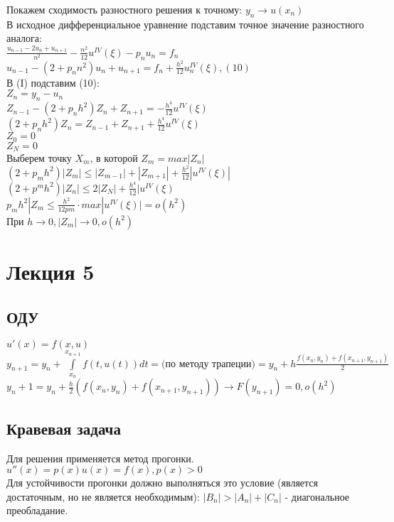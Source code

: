 Покажем сходимость разностного решения к точному: $y_{n} \rightarrow u(x_{n})$\\
В исходное дифференциальное уравнение подставим точное значение разностного аналога:\\
$\frac{u_{n-1} - 2u_{n} + u_{n+1}}{n^{2}} - \frac{n^{2}}{12} u^{IV}(\xi) - p_{n} u_{n} = f_{n}$\\
$u_{n-1} - (2 + p_{n} n^{2})u_{n} + u_{n+1}  = f_{n} + \frac{h^{2}}{12} u_{n}^{IV}(\xi), (10)$\\
В (I) подставим (10):\\
$Z_{n} = y_{n} - u_{n}$\\
$Z_{n-1} - (2 + p_{n} h^{2}) Z_{n} + Z_{n+1} = - \frac{h^{4}}{12}u^{IV}(\xi)$\\
$(2 + p_{n}h^{2})Z_{n} = Z_{n-1} + Z_{n+1} + \frac{h^{4}}{12}u^{IV}(\xi)$\\
$Z_{0} = 0$\\
$Z_{N} = 0$\\

Выберем точку $X_{m}$, в которой $Z_{m} = max|Z_{n}|$\\
$(2 + p_{m}h^{2})|Z_{m}| \leqslant |Z_{m-1}| + |Z_{m+1}| + \frac{h^{2}}{12}|u^{IV}(\xi)|$\\
$(2 + p^{m}h^{2})|Z_{n}| \leqslant 2 |Z_{N}| + \frac{h^{4}}{12}|u^{IV}(\xi)$\\
$p_{m}h^{2}|Z_{m} \leqslant \frac{h^{2}}{12pm} \cdot max|u^{IV}(\xi)| = o(h^{2})$\\
При $h \rightarrow 0, |Z_{m}| \rightarrow 0, o(h^{2})$\\

\chapter{Лекция 5}
\section{ОДУ}
$u'(x) = f(x, u)$\\
$y_{n+1} = y_{n} + \int\limits_{x_{n}}^{x_{n+1}}f(t, u(t))dt = \text{(по методу трапеции)} = y_{n} + h\frac{f(x_{n}, y_{n}) + f(x_{n+1}, y_{n+1})}{2}$\\
$y_n+1 = y_{n} + \frac{h}{2}(f(x_{n}, y_{n}) + f(x_{n+1}, y_{n+1})) \rightarrow F(y_{n+1}) = 0, o(h^{2})$\\

\section{Кравевая задача}
Для решения применяется метод прогонки.\\
$u''(x) = p(x) u(x) = f(x), p(x) >0$\\
Для устойчивости прогонки должно выполняться это условие (является достаточным, но не является необходимым): $|B_{n}| > |A_{n}| + |C_{n}|$ - диагональное преобладание.\\

